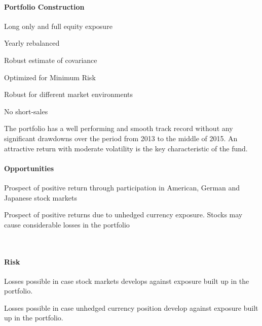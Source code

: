 \documentclass[11pt, parskip=full, DIV=14]{scrreprt}
\begin{document}
\begin{minipage}{0.5\textwidth}
\paragraph{Portfolio Construction}
\begin{sit}
\item Long only and full equity exposure
\item Yearly rebalanced
\item Robust estimate of covariance
\item Optimized for Minimum Risk
\item Robust for different market environments
\item No short-sales
\end{sit}
\end{minipage}
\begin{minipage}{0.5\textwidth}
\end{minipage}


The portfolio has a well performing and smooth track record without any significant drawdowns over the period from 2013 to the middle of 2015.
An attractive return with moderate volatility is the key characteristic of the fund.
 

\begin{minipage}[t]{0.49\textwidth}
  \paragraph{Opportunities}
  \begin{sit}
  \item Prospect of positive return through participation in American, German and Japanese stock markets
  \item Prospect of positive returns due to unhedged currency exposure. Stocks may cause considerable losses in the portfolio
  \end{sit}
\end{minipage}
~~
\begin{minipage}[t]{0.49\textwidth}
  \paragraph{Risk}
  \begin{sit}
  \item Losses possible in case stock markets develops against exposure built up in the portfolio.
  \item Losses possible in case unhedged currency position develop against exposure built up in the portfolio.
  \end{sit}
\end{minipage}
\end{document}

